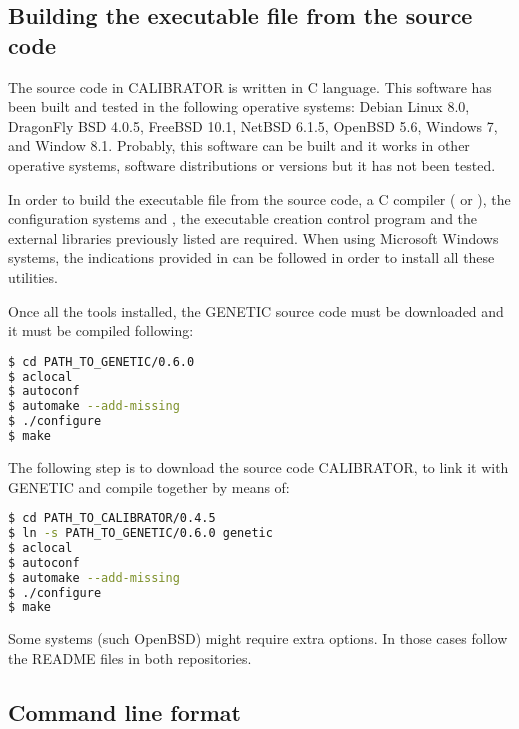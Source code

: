 \documentclass[review,authoryear]{elsarticle}
\begin{document}
\subsection{Building the executable file from the source code}

The source code in CALIBRATOR is written in C language. This software has
been built and tested in the following operative systems:
Debian Linux 8.0,
DragonFly BSD 4.0.5,
FreeBSD 10.1,
NetBSD 6.1.5,
OpenBSD 5.6,
Windows 7\footnotemark[1],
and Window 8.1\footnotemark[1].
Probably, this software can be built and it works in other operative systems,
software distributions or versions but it has not been tested.

In order to build the executable file from the source code, a C compiler (\citet{gcc} or \citet{clang}), the configuration systems \citet{autoconf} and \citet{automake}, the executable creation control program \citet{gnumake} and the external libraries previously listed are required. When using Microsoft Windows systems, the indications provided in \citet{mingw-make} can be followed in order to install all these utilities.

Once all the tools installed, the GENETIC source code must be downloaded and it must be compiled following:
\begin{lstlisting}[language=bash,basicstyle=\scriptsize]
$ cd PATH_TO_GENETIC/0.6.0
$ aclocal
$ autoconf
$ automake --add-missing
$ ./configure
$ make
\end{lstlisting}

The following step is to download the source code CALIBRATOR, to link it with GENETIC and compile together by means of:
\begin{lstlisting}[language=bash,basicstyle=\scriptsize]
$ cd PATH_TO_CALIBRATOR/0.4.5
$ ln -s PATH_TO_GENETIC/0.6.0 genetic
$ aclocal
$ autoconf
$ automake --add-missing
$ ./configure
$ make
\end{lstlisting}

Some systems (such OpenBSD) might require extra options. In those cases follow the README files in both repositories.

\subsection{Command line format}
\end{document}
